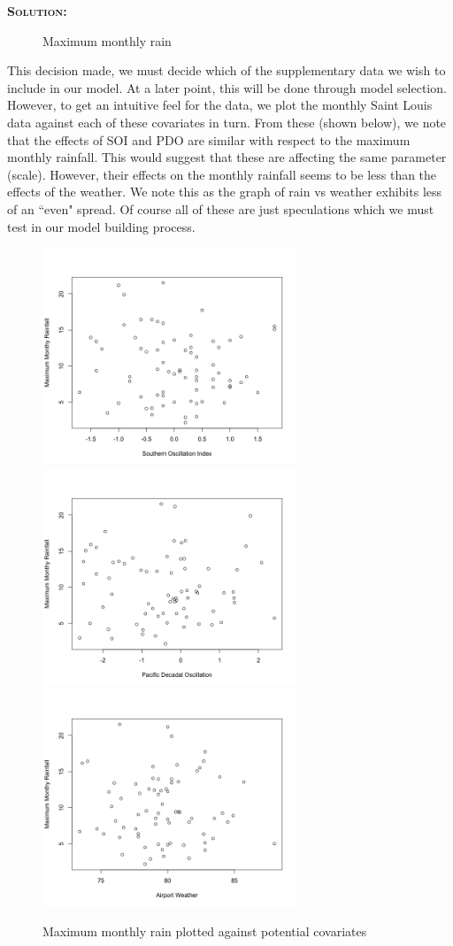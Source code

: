 \documentclass[12pt,oneside]{article}
\newenvironment{solution}
    {\textbf{\textsc{Solution:}}\\}
    {\newpage}
\begin{document}
\begin{solution}
\begin{figure}[H]
\begin{center}
\caption{Maximum monthly rain}
\end{center}
\end{figure}
\noindent This decision made, we must decide which of the supplementary data we wish to include in our model. At a later point, this will be done through model selection. However, to get an intuitive feel for the data, we plot the monthly Saint Louis data against each of these covariates in turn. From these (shown below), we note that the effects of SOI and PDO are similar with respect to the maximum monthly rainfall. This would suggest that these are affecting the same parameter (scale). However, their effects on the monthly rainfall seems to be less than the effects of the weather. We note this as the graph of rain vs weather exhibits less of an ``even" spread. Of course all of these are just speculations which we must test in our model building process.
\begin{figure}[H]
\begin{center}
{\includegraphics[width=3in]{Assignments/a3/rain-vs-soi.png}}
{\includegraphics[width=3in]{Assignments/a3/rain-vs-pdo.png}}
{\includegraphics[width=3in]{Assignments/a3/rain-vs-temp.png}}
\caption{Maximum monthly rain plotted against potential covariates }
\end{center}
\end{figure}


\end{solution}
\end{document}
